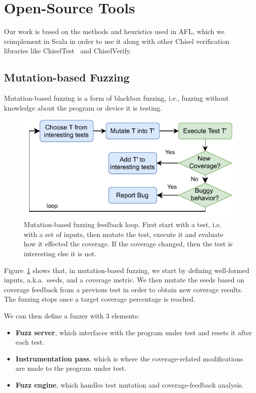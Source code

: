 \documentclass[conference]{IEEEtran}
\begin{document}
\section{Open-Source Tools}
\label{sec:tools}

Our work is based on the methods and heuristics used in AFL, which we reimplement in Scala in order to use it along with other Chisel verification libraries like ChiselTest~\cite{chisel:tester2} and ChiselVerify.

\subsection{Mutation-based Fuzzing}
Mutation-based fuzzing is a form of blackbox fuzzing, i.e., fuzzing without knowledge about the program or device it is testing.
\begin{figure}
  \centering
    \includegraphics[width=0.9\linewidth]{mutation-fuzzing.pdf}
    \caption{Mutation-based fuzzing feedback loop. First start with a test, i.e.\, with a set of inputs, then mutate the test, execute it and evaluate how it effected the coverage. If the coverage changed, then the test is interesting else it is not.}
\label{fig:mut-fuzz}
\end{figure}

Figure~\ref{fig:mut-fuzz} shows that, in mutation-based fuzzing, we start by defining well-formed inputs, a.k.a.\ seeds, and a coverage metric. 
We then mutate the seeds based on coverage feedback from a previous test in order to obtain new coverage results. 
The fuzzing stops once a target coverage percentage is reached.

We can then define a fuzzer with 3 elements:
\begin{itemize}
\item \textbf{Fuzz server}, which interfaces with the program under test and resets it after each test.
\item \textbf{Instrumentation pass}, which is where the coverage-related modifications are made to the program under test.
\item \textbf{Fuzz engine}, which handles test mutation and coverage-feedback analysis.
\end{itemize}
\end{document}
